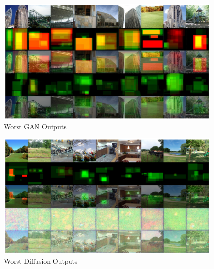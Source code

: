 \documentclass{UoYCSproject}
\begin{document}
\begin{figure}[ht]
    \centering
    \includegraphics[width=\linewidth]{Worst GAN Outputs}
    \caption{Worst GAN Outputs}
    \label{fig:GANWorstOutput}
\end{figure}

\begin{figure}[ht]
    \centering
    \includegraphics[width=\linewidth]{Worst Diffusion Outputs}
    \caption{Worst Diffusion Outputs}
    \label{fig:DiffusionWorstOutput}
\end{figure}

\printbibliography
\end{document}
